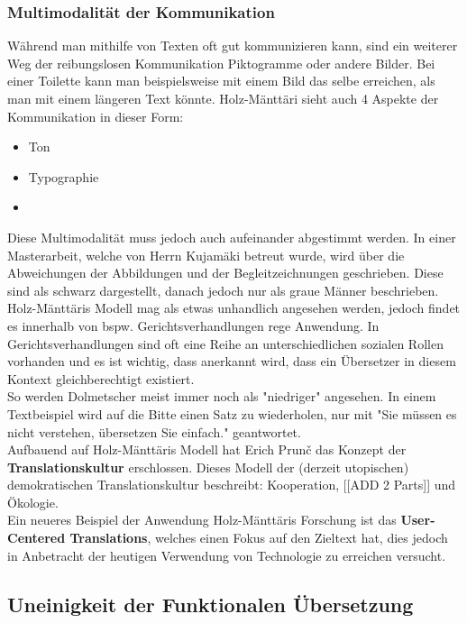 \documentclass{article}
\begin{document}
	\subsubsection{Multimodalität der Kommunikation}
	Während man mithilfe von Texten oft gut kommunizieren kann, sind ein weiterer Weg der reibungslosen Kommunikation Piktogramme oder andere Bilder. Bei einer Toilette kann man beispielsweise mit einem Bild das selbe erreichen, als man mit einem längeren Text könnte. Holz-Mänttäri sieht auch 4 Aspekte der Kommunikation in dieser Form:
	\begin{itemize}
		\item{Ton}
		\item{Typographie}
		\item{}
	\end{itemize}

	Diese Multimodalität muss jedoch auch aufeinander abgestimmt werden. In einer Masterarbeit, welche von Herrn Kujamäki betreut wurde, wird über die Abweichungen der Abbildungen und der Begleitzeichnungen geschrieben. Diese sind als schwarz dargestellt, danach jedoch nur als graue Männer beschrieben. \\
	Holz-Mänttäris Modell mag als etwas unhandlich angesehen werden, jedoch findet es innerhalb von bspw. Gerichtsverhandlungen rege Anwendung. In Gerichtsverhandlungen sind oft eine Reihe an unterschiedlichen sozialen Rollen vorhanden und es ist wichtig, dass anerkannt wird, dass ein Übersetzer in diesem Kontext gleichberechtigt existiert. \\
	So werden Dolmetscher meist immer noch als "niedriger" angesehen. In einem Textbeispiel wird auf die Bitte einen Satz zu wiederholen, nur mit "Sie müssen es nicht verstehen, übersetzen Sie einfach." geantwortet. \\
	Aufbauend auf Holz-Mänttäris Modell hat Erich Prun\v c das Konzept der \textbf{Translationskultur} erschlossen. Dieses Modell der (derzeit utopischen) demokratischen Translationskultur beschreibt: Kooperation, [[ADD 2 Parts]] und Ökologie.\\
	Ein neueres Beispiel der Anwendung Holz-Mänttäris Forschung ist das \textbf{User-Centered Translations}, welches einen Fokus auf den Zieltext hat, dies jedoch in Anbetracht der heutigen Verwendung von Technologie zu erreichen versucht. \\
	\subsection{Uneinigkeit der Funktionalen Übersetzung}
\end{document}

